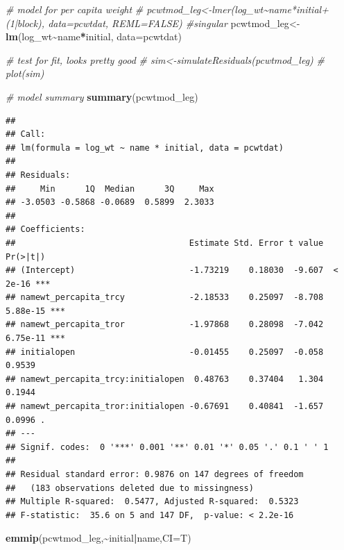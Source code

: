 \documentclass[
]{article}
\newenvironment{Shaded}{\begin{snugshade}}{\end{snugshade}}
\newcommand{\AttributeTok}[1]{\textcolor[rgb]{0.13,0.29,0.53}{#1}}
\newcommand{\CommentTok}[1]{\textcolor[rgb]{0.56,0.35,0.01}{\textit{#1}}}
\newcommand{\FunctionTok}[1]{\textcolor[rgb]{0.13,0.29,0.53}{\textbf{#1}}}
\newcommand{\NormalTok}[1]{#1}
\newcommand{\OtherTok}[1]{\textcolor[rgb]{0.56,0.35,0.01}{#1}}
\newcommand{\SpecialCharTok}[1]{\textcolor[rgb]{0.81,0.36,0.00}{\textbf{#1}}}
\begin{document}
\begin{Shaded}
\begin{Highlighting}[]
\CommentTok{\# model for per capita weight}
\CommentTok{\# pcwtmod\_leg\textless{}{-}lmer(log\_wt\textasciitilde{}name*initial+(1|block), data=pcwtdat, REML=FALSE) \#singular}
\NormalTok{pcwtmod\_leg}\OtherTok{\textless{}{-}}\FunctionTok{lm}\NormalTok{(log\_wt}\SpecialCharTok{\textasciitilde{}}\NormalTok{name}\SpecialCharTok{*}\NormalTok{initial, }\AttributeTok{data=}\NormalTok{pcwtdat)}

\CommentTok{\# test for fit, looks pretty good}
\CommentTok{\# sim\textless{}{-}simulateResiduals(pcwtmod\_leg)}
\CommentTok{\# plot(sim)}

\CommentTok{\# model summary}
\FunctionTok{summary}\NormalTok{(pcwtmod\_leg)}
\end{Highlighting}
\end{Shaded}

\begin{verbatim}
## 
## Call:
## lm(formula = log_wt ~ name * initial, data = pcwtdat)
## 
## Residuals:
##     Min      1Q  Median      3Q     Max 
## -3.0503 -0.5868 -0.0689  0.5899  2.3033 
## 
## Coefficients:
##                                   Estimate Std. Error t value Pr(>|t|)    
## (Intercept)                       -1.73219    0.18030  -9.607  < 2e-16 ***
## namewt_percapita_trcy             -2.18533    0.25097  -8.708 5.88e-15 ***
## namewt_percapita_tror             -1.97868    0.28098  -7.042 6.75e-11 ***
## initialopen                       -0.01455    0.25097  -0.058   0.9539    
## namewt_percapita_trcy:initialopen  0.48763    0.37404   1.304   0.1944    
## namewt_percapita_tror:initialopen -0.67691    0.40841  -1.657   0.0996 .  
## ---
## Signif. codes:  0 '***' 0.001 '**' 0.01 '*' 0.05 '.' 0.1 ' ' 1
## 
## Residual standard error: 0.9876 on 147 degrees of freedom
##   (183 observations deleted due to missingness)
## Multiple R-squared:  0.5477, Adjusted R-squared:  0.5323 
## F-statistic:  35.6 on 5 and 147 DF,  p-value: < 2.2e-16
\end{verbatim}

\begin{Shaded}
\begin{Highlighting}[]
\FunctionTok{emmip}\NormalTok{(pcwtmod\_leg,}\SpecialCharTok{\textasciitilde{}}\NormalTok{initial}\SpecialCharTok{|}\NormalTok{name,}\AttributeTok{CI=}\NormalTok{T)}
\end{Highlighting}
\end{Shaded}
\end{document}
